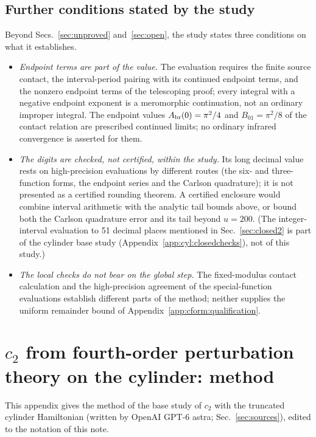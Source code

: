 \documentclass[11pt,a4paper]{article}
\numberwithin{equation}{section}
\begin{document}
\subsection{Further conditions stated by the study}\label{app:cform:status}
Beyond Secs.~\ref{sec:unproved} and~\ref{sec:open}, the study states three conditions on what it establishes.
\begin{itemize}
\item \emph{Endpoint terms are part of the value.} The evaluation requires the finite source contact, the
 interval-period pairing with its continued endpoint terms, and the nonzero endpoint terms of the telescoping proof;
 every integral with a negative endpoint exponent is a meromorphic continuation, not an ordinary improper integral.
 The endpoint values $A_{\rm br}(0)=\pi^2/4$ and $B_{01}=\pi^2/8$ of the contact relation are prescribed continued
 limits; no ordinary infrared convergence is asserted for them.
\item \emph{The digits are checked, not certified, within the study.} Its long decimal value rests on
 high-precision evaluations by different routes (the six- and three-function forms, the endpoint series and the
 Carlson quadrature); it is not presented as a certified rounding theorem. A certified enclosure would
 combine interval arithmetic with the analytic tail bounds above, or bound both the Carlson quadrature error and its
 tail beyond $u=200$. (The integer-interval evaluation to 51 decimal places mentioned in Sec.~\ref{sec:closed2} is part
 of the cylinder base study (Appendix~\ref{app:cyl:closedchecks}), not of this study.)
\item \emph{The local checks do not bear on the global step.} The fixed-modulus contact calculation and the
 high-precision agreement of the special-function evaluations establish different parts of the method; neither
 supplies the uniform remainder bound of Appendix~\ref{app:cform:qualification}.
\end{itemize}

\section{\texorpdfstring{$c_2$}{c2} from fourth-order perturbation theory on the cylinder: method}\label{app:cyl}
This appendix gives the method of the base study of $c_2$ with the truncated cylinder Hamiltonian (written by OpenAI
GPT-6 astra; Sec.~\ref{sec:sources}), edited to the notation of this note.
\end{document}
